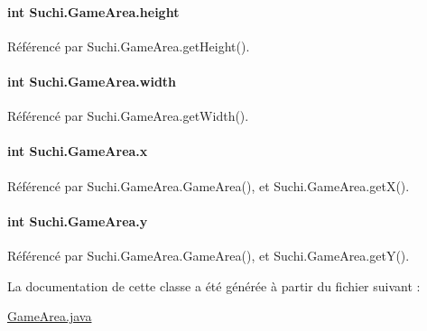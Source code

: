 \paragraph[{height}]{\setlength{\rightskip}{0pt plus 5cm}int Suchi.\+Game\+Area.\+height\hspace{0.3cm}{\ttfamily [private]}}\label{classSuchi_1_1GameArea_a1b2fcf63587bc1c370a741151a67ff6d}


Référencé par Suchi.\+Game\+Area.\+get\+Height().

\hypertarget{classSuchi_1_1GameArea_ad959f934234c4765e29d8bf0291a04cc}{}
\paragraph[{width}]{\setlength{\rightskip}{0pt plus 5cm}int Suchi.\+Game\+Area.\+width\hspace{0.3cm}{\ttfamily [private]}}\label{classSuchi_1_1GameArea_ad959f934234c4765e29d8bf0291a04cc}


Référencé par Suchi.\+Game\+Area.\+get\+Width().

\hypertarget{classSuchi_1_1GameArea_aa89bcaf59584201e5cdbf3006e33880b}{}
\paragraph[{x}]{\setlength{\rightskip}{0pt plus 5cm}int Suchi.\+Game\+Area.\+x\hspace{0.3cm}{\ttfamily [private]}}\label{classSuchi_1_1GameArea_aa89bcaf59584201e5cdbf3006e33880b}


Référencé par Suchi.\+Game\+Area.\+Game\+Area(), et Suchi.\+Game\+Area.\+get\+X().

\hypertarget{classSuchi_1_1GameArea_a21715e2b105c4d602b0eabfa550d6e3a}{}
\paragraph[{y}]{\setlength{\rightskip}{0pt plus 5cm}int Suchi.\+Game\+Area.\+y\hspace{0.3cm}{\ttfamily [private]}}\label{classSuchi_1_1GameArea_a21715e2b105c4d602b0eabfa550d6e3a}


Référencé par Suchi.\+Game\+Area.\+Game\+Area(), et Suchi.\+Game\+Area.\+get\+Y().



La documentation de cette classe a été générée à partir du fichier suivant \+:\begin{DoxyCompactItemize}
\item 
\hyperlink{GameArea_8java}{Game\+Area.\+java}\end{DoxyCompactItemize}
